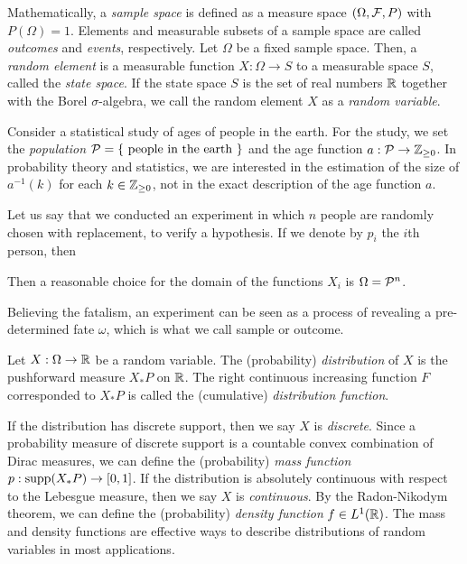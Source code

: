 \documentclass{../../large}
\begin{document}
\begin{prb}
Mathematically, a \emph{sample space} is defined as a measure space $(\Omega,\mathcal{F},P)$ with $P(\Omega)=1$.
Elements and measurable subsets of a sample space are called \emph{outcomes} and \emph{events}, respectively.
Let $\Omega$ be a fixed sample space.
Then, a \emph{random element} is a measurable function $X:\Omega\to S$ to a measurable space $S$, called the \emph{state space}. 
If the state space $S$ is the set of real numbers $\mathbb{R}$ together with the Borel $\sigma$-algebra, we call the random element $X$ as a \emph{random variable}.

Consider a statistical study of ages of people in the earth.
For the study, we set the \emph{population} $\mathcal{P}=\{\text{ people in the earth }\}$ and the age function $a:\mathcal{P}\to\mathbb{Z}_{\ge0}$.
In probability theory and statistics, we are interested in the estimation of the size of $a^{-1}(k)$ for each $k\in\mathbb{Z}_{\ge0}$, not in the exact description of the age function $a$.

Let us say that we conducted an experiment in which $n$ people are randomly chosen with replacement, to verify a hypothesis.
If we denote by $p_i$ the $i$th person, then 

Then a reasonable choice for the domain of the functions $X_i$ is $\Omega=\mathcal{P}^n$.

Believing the fatalism, an experiment can be seen as a process of revealing a pre-determined fate $\omega$, which is what we call sample or outcome.


\begin{parts}
\item 
\end{parts}
\end{prb}
\begin{prb}
Let $X:\Omega\to\mathbb{R}$ be a random variable.
The (probability) \emph{distribution} of $X$ is the pushforward measure $X_*P$ on $\mathbb{R}$.
The right continuous increasing function $F$ corresponded to $X_*P$ is called the (cumulative) \emph{distribution function}.

If the distribution has discrete support, then we say $X$ is \emph{discrete}.
Since a probability measure of discrete support is a countable convex combination of Dirac measures, we can define the (probability) \emph{mass function} $p:\operatorname{supp}(X_*P)\to[0,1]$.
If the distribution is absolutely continuous with respect to the Lebesgue measure, then we say $X$ is \emph{continuous}.
By the Radon-Nikodym theorem, we can define the (probability) \emph{density function} $f\in L^1(\mathbb{R})$.
The mass and density functions are effective ways to describe distributions of random variables in most applications.
\begin{parts}
\item
\end{parts}
\end{prb}
\end{document}
